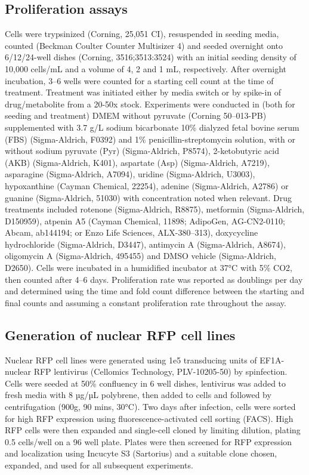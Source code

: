\subsection{Proliferation assays}
Cells were trypsinized (Corning, 25,051 CI), resuspended in seeding media, counted (Beckman Coulter Counter Multisizer 4) and seeded overnight onto 6/12/24-well dishes (Corning, 3516;3513:3524) with an initial seeding density of 10,000 cells/mL and a volume of 4, 2 and 1 mL, respectively.
After overnight incubation, 3–6 wells were counted for a starting cell count at the time of treatment.
Treatment was initiated either by media switch or by spike-in of drug/metabolite from a 20-50x stock.
Experiments were conducted in (both for seeding and treatment) DMEM without pyruvate (Corning 50–013-PB) supplemented with 3.7 g/L sodium bicarbonate 10\% dialyzed fetal bovine serum (FBS) (Sigma-Aldrich, F0392) and 1\% penicillin-streptomycin solution, with or without sodium pyruvate (Pyr) (Sigma-Aldrich, P8574), 2-ketobutyric acid (AKB) (Sigma-Aldrich, K401), aspartate (Asp) (Sigma-Aldrich, A7219), asparagine (Sigma-Aldrich, A7094), uridine (Sigma-Aldrich, U3003), hypoxanthine (Cayman Chemical, 22254), adenine (Sigma-Aldrich, A2786) or guanine (Sigma-Aldrich, 51030) with concentration noted when relevant.
Drug treatments included rotenone (Sigma-Aldrich, R8875), metformin (Sigma-Aldrich, D150959), atpenin A5 (Cayman Chemical, 11898; AdipoGen, AG-CN2-0110; Abcam, ab144194; or Enzo Life Sciences, ALX-380–313), doxycycline hydrochloride (Sigma-Aldrich, D3447), antimycin A (Sigma-Aldrich, A8674), oligomycin A (Sigma-Aldrich, 495455) and DMSO vehicle (Sigma-Aldrich, D2650).
Cells were incubated in a humidified incubator at 37°C with 5\% CO2, then counted after 4–6 days.
Proliferation rate was reported as doublings per day and determined using the time and fold count difference between the starting and final counts and assuming a constant proliferation rate throughout the assay.




\subsection{Generation of nuclear RFP cell lines}
Nuclear RFP cell lines were generated using 1e5 transducing units of EF1A-nuclear RFP lentivirus (Cellomics Technology, PLV-10205-50) by spinfection.
Cells were seeded at 50\% confluency in 6 well dishes, lentivirus was added to fresh media with 8 µg/µL polybrene, then added to cells and followed by centrifugation (900g, 90 mins, 30°C).
Two days after infection, cells were sorted for high RFP expression using fluorescence-activated cell sorting (FACS).
High RFP cells were then expanded and single-cell cloned by limiting dilution, plating 0.5 cells/well on a 96 well plate.
Plates were then screened for RFP expression and localization using Incucyte S3 (Sartorius) and a suitable clone chosen, expanded, and used for all subsequent experiments.

